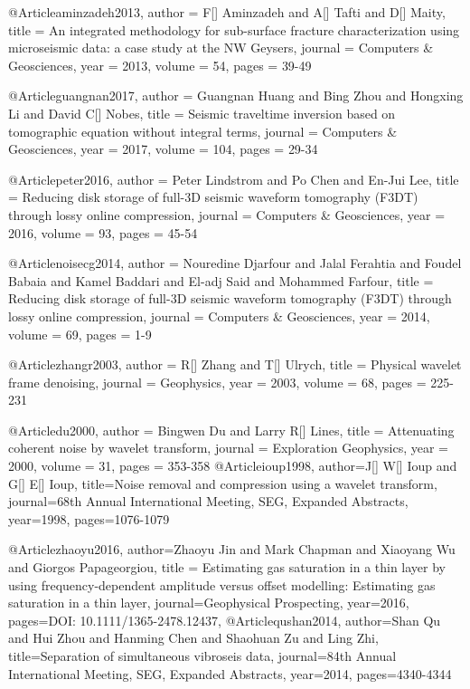 @Article{aminzadeh2013,
  author = 	 {F[] Aminzadeh and A[] Tafti and D[] Maity},
  title = 	 {An integrated methodology for sub-surface fracture characterization using microseismic data: a case study at the NW {G}eysers},
  journal = 	 { Computers \& Geosciences},
  year = 	 2013,
  volume = 	 54,
  pages = 	 {39-49}}
  
 @Article{guangnan2017,
  author = 	 {Guangnan Huang and Bing Zhou and Hongxing Li and David C[] Nobes},
  title = 	 {Seismic traveltime inversion based on tomographic equation without integral terms},
  journal = 	 { Computers \& Geosciences},
  year = 	 2017,
  volume = 	 104,
  pages = 	 {29-34}} 

 @Article{peter2016,
  author = 	 {Peter Lindstrom and Po Chen and En-Jui Lee},
  title = 	 {Reducing disk storage of full-3{D} seismic waveform tomography ({F3DT}) through lossy online compression},
  journal = 	 { Computers \& Geosciences},
  year = 	 2016,
  volume = 	 93,
  pages = 	 {45-54}} 
  
 @Article{noisecg2014,
  author = 	 {Nouredine Djarfour and Jalal Ferahtia and Foudel Babaia and Kamel Baddari and El-adj Said and Mohammed Farfour},
  title = 	 {Reducing disk storage of full-3D seismic waveform tomography (F3DT) through lossy online compression},
  journal = 	 { Computers \& Geosciences},
  year = 	 2014,
  volume = 	 69,
  pages = 	 {1-9}} 
  


@Article{zhangr2003,
  author = 	 {R[] Zhang and T[] Ulrych},
  title = 	 {Physical wavelet frame denoising},
  journal = 	 {Geophysics},
  year = 	 2003,
  volume = 	 68,
  pages = 	 {225-231}}

@Article{du2000,
  author = 	 {Bingwen Du and Larry R[] Lines},
  title = 	 {Attenuating coherent noise by wavelet transform},
  journal = 	 {Exploration Geophysics},
  year = 	 2000,
  volume = 	 31,
  pages = 	 {353-358}}
@Article{ioup1998,
  author={J[] W[] Ioup and G[] E[] Ioup},
  title={Noise removal and compression using a wavelet transform},
  journal={68th Annual International Meeting, SEG, Expanded Abstracts},
  year=1998,
  pages={1076-1079}
}

@Article{zhaoyu2016,
  author={Zhaoyu Jin and Mark Chapman and Xiaoyang Wu and Giorgos Papageorgiou},
  title = {Estimating gas saturation in a thin layer by using frequency-dependent amplitude versus offset modelling: Estimating gas saturation in a thin layer},
  journal={Geophysical Prospecting},
  year=2016,
  pages={DOI: 10.1111/1365-2478.12437},
}
@Article{qushan2014,
  author={Shan Qu and Hui Zhou and Hanming Chen and Shaohuan Zu and Ling Zhi},
  title={Separation of simultaneous vibroseis data},
  journal={84th Annual International Meeting, SEG, Expanded Abstracts},
  year=2014,
  pages={4340-4344}
}

